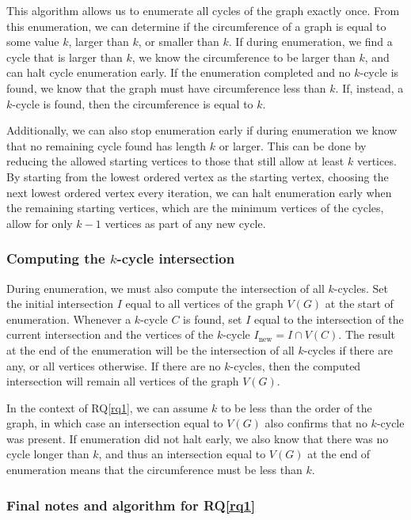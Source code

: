 This algorithm allows us to enumerate all cycles of the graph exactly once. From this enumeration, we can determine if the circumference of a graph is equal to some value $k$, larger than $k$, or smaller than $k$. If during enumeration, we find a cycle that is larger than $k$, we know the circumference to be larger than $k$, and can halt cycle enumeration early. If the enumeration completed and no $k$-cycle is found, we know that the graph must have circumference less than $k$. If, instead, a $k$-cycle is found, then the circumference is equal to $k$.

Additionally, we can also stop enumeration early if during enumeration we know that no remaining cycle found has length $k$ or larger. This can be done by reducing the allowed starting vertices to those that still allow at least $k$ vertices. By starting from the lowest ordered vertex as the starting vertex, choosing the next lowest ordered vertex every iteration, we can halt enumeration early when the remaining starting vertices, which are the minimum vertices of the cycles, allow for only $k-1$ vertices as part of any new cycle.

\subsubsection{Computing the $k$-cycle intersection}

During enumeration, we must also compute the intersection of all $k$-cycles. Set the initial intersection $I$ equal to all vertices of the graph $V(G)$ at the start of enumeration. Whenever a $k$-cycle $C$ is found, set $I$ equal to the intersection of the current intersection and the vertices of the $k$-cycle $I_{\text{new}} = I \cap V(C)$. The result at the end of the enumeration will be the intersection of all $k$-cycles if there are any, or all vertices otherwise. If there are no $k$-cycles, then the computed intersection will remain all vertices of the graph $V(G)$.

In the context of RQ\ref{rq1}, we can assume $k$ to be less than the order of the graph, in which case an intersection equal to $V(G)$ also confirms that no $k$-cycle was present. If enumeration did not halt early, we also know that there was no cycle longer than $k$, and thus an intersection equal to $V(G)$ at the end of enumeration means that the circumference must be less than $k$.

\subsubsection{Final notes and algorithm for RQ\ref{rq1}}

